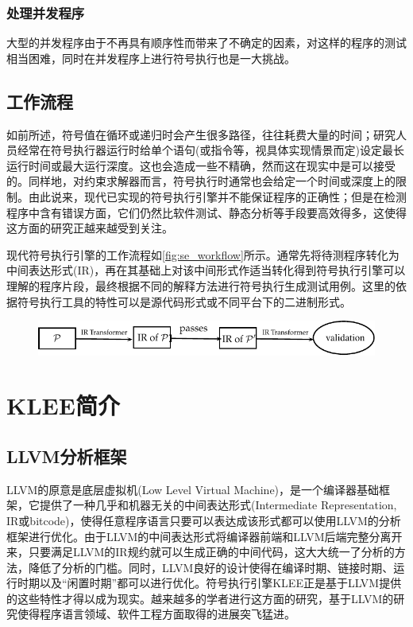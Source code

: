 \subsubsection{处理并发程序}
\label{sec:concurrency}

大型的并发程序由于不再具有顺序性而带来了不确定的因素，对这样的程序的测试相当困难，同时在并发程序上进行符号执行也是一大挑战。

\subsection{工作流程}
\label{sec:tool}

如前所述，符号值在循环或递归时会产生很多路径，往往耗费大量的时间；研究人员经常在符号执行器运行时给单个语句(或指令等，视具体实现情景而定)设定最长运行时间或最大运行深度。这也会造成一些不精确，然而这在现实中是可以接受的。同样地，对约束求解器而言，符号执行时通常也会给定一个时间或深度上的限制。由此说来，现代已实现的符号执行引擎并不能保证程序的正确性；但是在检测程序中含有错误方面，它们仍然比软件测试、静态分析等手段要高效得多，这使得这方面的研究正越来越受到关注。

现代符号执行引擎的工作流程如\autoref{fig:se_workflow}所示。通常先将待测程序\patch 转化为中间表达形式(IR)，再在其基础上对该中间形式作适当转化得到符号执行引擎可以理解的程序片段，最终根据不同的解释方法进行符号执行生成测试用例。这里的\patch 依据符号执行工具的特性可以是源代码形式或不同平台下的二进制形式。
\begin{figure}[t]
\begin{center}
\includegraphics[width=.9\textwidth]{fig/se_workflow.pdf}
\end{center}
\end{figure}

\section{KLEE简介}
\label{sec:llvm_klee}

\subsection{LLVM分析框架}
\label{sec:llvm}
LLVM的原意是底层虚拟机(Low Level Virtual Machine)，是一个编译器基础框架，它提供了一种几乎和机器无关的中间表达形式(Intermediate Representation, IR或bitcode)，使得任意程序语言只要可以表达成该形式都可以使用LLVM的分析框架进行优化。由于LLVM的中间表达形式将编译器前端和LLVM后端完整分离开来，只要满足LLVM的IR规约就可以生成正确的中间代码，这大大统一了分析的方法，降低了分析的门槛。同时，LLVM良好的设计使得在编译时期、链接时期、运行时期以及“闲置时期”都可以进行优化。符号执行引擎KLEE正是基于LLVM提供的这些特性才得以成为现实。越来越多的学者进行这方面的研究，基于LLVM的研究使得程序语言领域、软件工程方面取得的进展突飞猛进。

